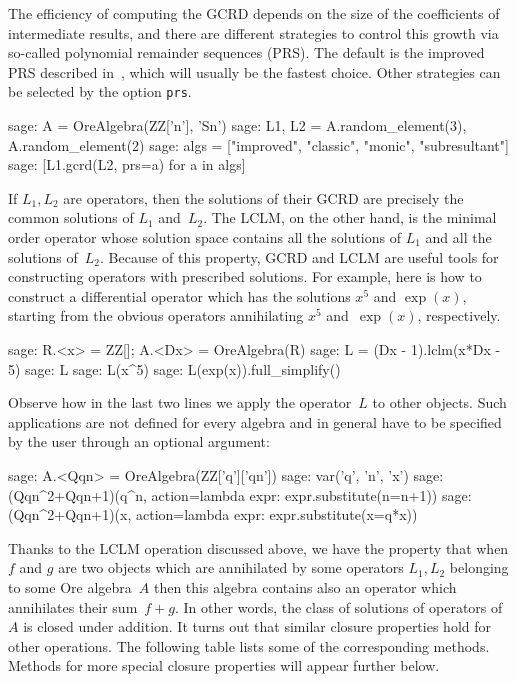 \documentclass{llncs}
\begin{document}
The efficiency of computing the GCRD depends on the size of the
coefficients of intermediate results, and there are different strategies to
control this growth via so-called polynomial remainder sequences (PRS). The default is
the improved PRS described in~\cite{jaroschek13b}, which will usually be the
fastest choice. Other strategies can be selected by the option \verb|prs|.

\begin{sageexample}
  sage: A = OreAlgebra(ZZ['n'], 'Sn')
  sage: L1, L2 = A.random_element(3), A.random_element(2)
  sage: algs = ["improved", "classic", "monic", "subresultant"]
  sage: [L1.gcrd(L2, prs=a) for a in algs]
\end{sageexample}

If $L_1,L_2$ are operators, then the solutions of their GCRD are precisely the
common solutions of $L_1$ and~$L_2$. The LCLM, on the other hand, is the minimal
order operator whose solution space contains all the solutions of $L_1$ and
all the solutions of~$L_2$. Because of this property, GCRD and LCLM are
useful tools for constructing operators with prescribed solutions. For example,
here is how to construct a differential operator which has the solutions $x^5$
and $\exp(x)$, starting from the obvious operators annihilating $x^5$
and~$\exp(x)$, respectively.

\begin{sageexample}
  sage: R.<x> = ZZ[]; A.<Dx> = OreAlgebra(R)
  sage: L = (Dx - 1).lclm(x*Dx - 5)
  sage: L
  sage: L(x^5)
  sage: L(exp(x)).full_simplify() 
\end{sageexample}

Observe how in the last two lines we apply the operator~$L$ to other
objects. Such applications are not defined for every algebra and in general have
to be specified by the user through an optional argument:

\begin{sageexample}
  sage: A.<Qqn> = OreAlgebra(ZZ['q']['qn'])
  sage: var('q', 'n', 'x')
  sage: (Qqn^2+Qqn+1)(q^n, action=lambda expr: expr.substitute(n=n+1))
  sage: (Qqn^2+Qqn+1)(x, action=lambda expr: expr.substitute(x=q*x))
\end{sageexample}

Thanks to the LCLM operation discussed above, we have the property that when $f$
and $g$ are two objects which are annihilated by some operators $L_1,L_2$
belonging to some Ore algebra~$A$ then this algebra contains also an operator
which annihilates their sum~$f+g$. In other words, the class of solutions of operators of
$A$ is closed under addition. It turns out that similar closure properties hold
for other operations. The following table lists some of the corresponding
methods. Methods for more special closure properties will appear further below.
\end{document}

